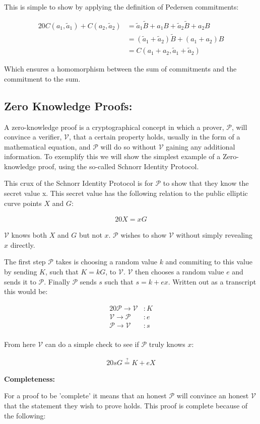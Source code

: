 \documentclass{article}
\newcommand{\eq}[1]{\begin{alignat*}{20}#1\end{alignat*}}
\newcommand{\V}{\mathcal{V}}
\renewcommand{\P}{\mathcal{P}}
\newcommand{\tB}{\widetilde{B}}
\begin{document}
This is simple to show by applying the definition of Pedersen
commitments: 

\eq{
	C(a_1,\widetilde{a}_1) + C(a_2,\widetilde{a}_2) &= \widetilde{a}_1\tB + a_1B  + \widetilde{a}_2\tB + a_2B \\
	                        &= (\widetilde{a}_1 + \widetilde{a}_2)\tB + (a_1 + a_2)B \\
	                        &= C(a_1+a_2,\widetilde{a}_1+\widetilde{a}_2)
}

Which ensures a homomorphism between the sum of commitments and the
commitment to the sum.

\subsection{Zero Knowledge Proofs:}\label{zero-knowledge}

A zero-knowledge proof is a cryptographical concept in which a prover,
$\P$, will convince a verifier, $\V$, that a certain property holds,
usually in the form of a mathematical equation, and $\P$ will do so
without $\V$ gaining any additional information. To exemplify this we
will show the simplest example of a Zero-knowledge proof, using the
so-called Schnorr Identity Protocol.

This crux of the Schnorr Identity Protocol is for $\P$ to show that
they know the secret value x. This secret value has the following
relation to the public elliptic curve points $X$ and $G$:

\eq{
	X = xG
}

$\V$ knows both $X$ and $G$ but not $x$. $\P$ wishes to show $\V$
without simply revealing $x$ directly.

The first step $\P$ takes is choosing a random value $k$ and commiting
to this value by sending $K$, such that $K = kG$, to $\V$. $\V$ then
chooses a random value $e$ and sends it to $\P$. Finally $\P$ sends $s$
such that $s = k + ex$. Written out as a transcript this would be:

\eq{
	\P \rightarrow \V &: K \\
	\V \rightarrow \P &: e \\
	\P \rightarrow \V &: s \\
}

From here $\V$ can do a simple check to see if $\P$ truly knows $x$:

\eq{
	sG \stackrel{?}{=} K + eX
}


\textbf{Completeness:}

For a proof to be 'complete' it means that an honest $\P$ will convince
an honest $\V$ that the statement they wish to prove holds. This proof
is complete because of the following:
\end{document}
